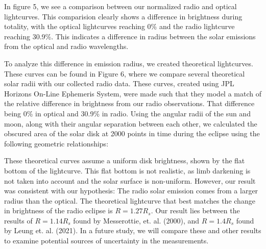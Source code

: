 In figure 5, we see a comparison between our normalized radio and optical lightcurves.
This comparision clearly shows a difference in brightness during totality, with the optical lightcurves reaching 0\% and the radio lightcurve reaching 30.9\%.
This indicates a difference in radius between the solar emissions from the optical and radio wavelengths.

To analyze this difference in emission radius, we created theoretical lightcurves.
These  curves can be found in Figure 6, where we compare several theoretical solar radii with our collected radio data.
These curves, created using JPL Horizons On-Line Ephemeris System, were made such that they model a match of the relative difference in brightness from our radio observations.
That difference being 0\% in optical and 30.9\% in radio.
Using the angular radii of the sun and moon, along with their angular separation between each other, we calculated the obscured area of the solar disk at 2000 points in time during the eclipse using the following geometric relationships:

These theoretical curves assume a uniform disk brightness, shown by the flat bottom of the lightcurve.
This flat bottom is not realistic, as limb darkening is not taken into account and the solar surface is non-uniform.
However, our result was consistent with our hypothesis: The radio solar emission comes from a larger radius than the optical.
The theoretical lightcurve that best matches the change in brightness of the radio eclipse is $R = 1.27R_s$.
Our result lies between the results of $R=1.14R_s$ found by Messerottie, et. al. (2000), and $R=1.4R_s$ found by Leung et. al. (2021).
In a future study, we will compare these and other results to examine potential sources of uncertainty in the measurements.
